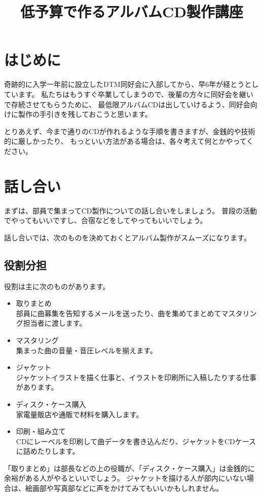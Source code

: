 \documentclass[11pt,a4paper]{jsarticle}
\title{低予算で作るアルバムCD製作講座}
\begin{document}
%
%
    \maketitle

    \tableofcontents

    \section{はじめに}
        奇跡的に入学一年前に設立したDTM同好会に入部してから、早6年が経とうとしています。
        私たちはもうすぐ卒業してしまうので、後輩の方々に同好会を継いで存続させてもらうために、
        最低限アルバムCDは出していけるよう、同好会向けに製作の手引きを残しておこうと思います。
        
        とりあえず、今まで通りのCDが作れるような手順を書きますが、金銭的や技術的に厳しかったり、
        もっといい方法がある場合は、各々考えて何とかやってください。




    \section{話し合い}
        まずは、部員で集まってCD製作についての話し合いをしましょう。
        普段の活動でやってもいいですし、合宿などをしてやってもいいでしょう。

        話し合いでは、次のものを決めておくとアルバム製作がスムーズになります。

        \subsection{役割分担}
            役割は主に次のものがあります。
            \begin{itemize}
                \item 取りまとめ \\
                    部員に曲募集を告知するメールを送ったり、曲を集めてまとめてマスタリング担当者に渡します。
                \item マスタリング \\
                    集まった曲の音量・音圧レベルを揃えます。
                \item ジャケット \\
                    ジャケットイラストを描く仕事と、イラストを印刷所に入稿したりする仕事があります。
                \item ディスク・ケース購入 \\
                    家電量販店や通販で材料を購入します。
                \item 印刷・組み立て \\
                    CDにレーベルを印刷して曲データを書き込んだり、ジャケットをCDケースに詰めたりします。
            \end{itemize}
            「取りまとめ」は部長などの上の役職が、「ディスク・ケース購入」は金銭的に余裕がある人がやるといいでしょう。
            ジャケットを描ける人が部内にいない場合は、絵画部や写真部などに声をかけてみてもいいかもしれません。
            
\end{document}
